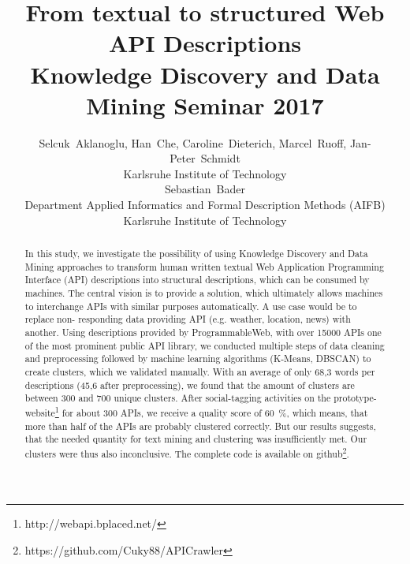 \documentclass[a4paper]{IEEEtran}
\begin{document}
\title{From textual to structured Web API Descriptions\\ \large Knowledge Discovery and Data Mining Seminar 2017 }


\author{Selcuk~Aklanoglu,
        Han~Che,
        Caroline~Dieterich,
        Marcel~Ruoff,
        Jan-Peter~Schmidt  \\
Karlsruhe Institute of Technology \\
Sebastian~Bader \\
Department Applied Informatics and  Formal Description Methods (AIFB)  \\
Karlsruhe Institute of Technology

}



\maketitle

\begin{abstract}
In this study, we investigate the possibility of using Knowledge Discovery and Data Mining approaches to transform human written textual Web Application Programming Interface
(API) descriptions into structural descriptions, which
can be consumed by machines. The central vision
is to provide a solution, which ultimately allows
machines to interchange APIs with similar purposes
automatically. A use case would be to replace non-
responding data providing API (e.g. weather,
location, news) with another. Using descriptions
provided by ProgrammableWeb, with over 15000
APIs one of the most prominent public API library,
we conducted multiple steps of data cleaning and
preprocessing followed by machine learning
algorithms (K-Means, DBSCAN) to create clusters,
which we validated manually. With an average of only
68,3 words per descriptions (45,6 after
preprocessing), we found that the amount of clusters are between 300 and 700 unique clusters. After social-tagging activities on the prototype-website\footnote{http://webapi.bplaced.net/} for about 300 APIs, we receive a quality score of 60~\%, which means, that more than half of the APIs are probably clustered correctly. But our results suggests, that the
needed quantity for text mining and clustering was insufficiently met. Our clusters were thus also inconclusive. 
The complete code is available on github\footnote{https://github.com/Cuky88/APICrawler}.
\end{abstract}


\IEEEpeerreviewmaketitle
\end{document}
